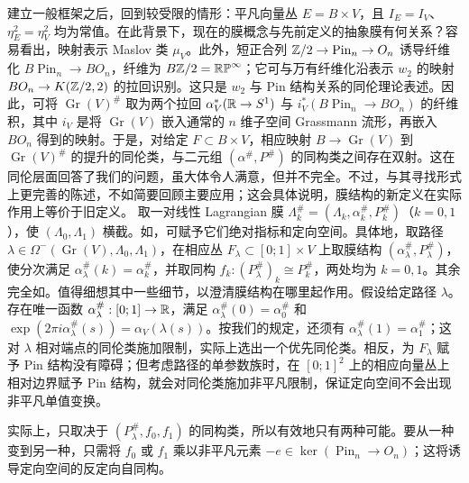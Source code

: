 建立一般框架之后，回到较受限的情形：平凡向量丛 $E=B\times V$，且 $I_E=I_V$、$\eta_E^2=\eta_V^2$ 均为常值。在此背景下，现在的膜概念与先前定义的抽象膜有何关系？容易看出，映射表示 Maslov 类 $\mu_V$。此外，短正合列 $\mathbb Z/2\to\operatorname{Pin}_n\to O_n$ 诱导纤维化 $B\operatorname{Pin}_n\to BO_n$，纤维为 $B\mathbb Z/2=\mathbb{RP}^\infty$；它可与万有纤维化沿表示 $w_2$ 的映射 $BO_n\to K(\mathbb Z/2,\allowbreak 2)$ 的拉回识别。这只是 $w_2$ 与 Pin 结构关系的同伦理论表述。因此，可将 $\operatorname{Gr}(V)^\#$ 取为两个拉回 $\alpha_V^*(\mathbb R\to S^1)$ 与 $i_V^*(B\operatorname{Pin}_n\to BO_n)$ 的纤维积，其中 $i_V$ 是将 $\operatorname{Gr}(V)$ 嵌入通常的 $n$ 维子空间 Grassmann 流形，再嵌入 $BO_n$ 得到的映射。于是，对给定 $F\subset B\times V$，相应映射 $B\to\operatorname{Gr}(V)$ 到 $\operatorname{Gr}(V)^\#$ 的提升的同伦类，与二元组 $(\alpha^\#,\allowbreak P^\#)$ 的同构类之间存在双射。这在同伦层面回答了我们的问题，虽大体令人满意，但并不完全。不过，与其寻找形式上更完善的陈述，不如简要回顾主要应用；这会具体说明，膜结构的新定义在实际作用上等价于旧定义。
取一对线性 Lagrangian 膜 $\Lambda_k^\#=(\Lambda_k,\allowbreak \alpha_k^\#,\allowbreak P_k^\#)$（$k=0,\allowbreak 1$），使 $(\Lambda_0,\allowbreak \Lambda_1)$ 横截。如，可赋予它们绝对指标和定向空间。具体地，取路径 $\lambda\in\Omega^-(\operatorname{Gr}(V),\allowbreak \Lambda_0,\allowbreak \Lambda_1)$，在相应丛 $F_\lambda\subset[0;1]\times V$ 上取膜结构 $(\alpha_\lambda^\#,\allowbreak P_\lambda^\#)$，使分次满足 $\alpha_\lambda^\#(k)=\alpha_k^\#$，并取同构 $f_k:(P_\lambda^\#)_k\cong P_k^\#$，两处均为 $k=0,\allowbreak 1$。其余完全如。值得细想其中一些细节，以澄清膜结构在哪里起作用。假设给定路径 $\lambda$。存在唯一函数 $\alpha_\lambda^\#:[0;1]\to\mathbb R$，满足 $\alpha_\lambda^\#(0)=\alpha_0^\#$ 和 $\exp(2\pi i\alpha_\lambda^\#(s))=\alpha_V(\lambda(s))$。按我们的规定，还须有 $\alpha_\lambda^\#(1)=\alpha_1^\#$；这对 $\lambda$ 相对端点的同伦类施加限制，实际上选出一个优先同伦类。相反，为 $F_\lambda$ 赋予 Pin 结构没有障碍；但考虑路径的单参数族时，在 $[0;1]^2$ 上的相应向量丛上相对边界赋予 Pin 结构，就会对同伦类施加非平凡限制，保证定向空间不会出现非平凡单值变换。
\begin{note}\label{st:11.19}
实际上，只取决于 $(P_\lambda^\#,\allowbreak f_0,\allowbreak f_1)$ 的同构类，所以有效地只有两种可能。要从一种变到另一种，只需将 $f_0$ 或 $f_1$ 乘以非平凡元素 $-e\in\ker(\operatorname{Pin}_n\to O_n)$；这将诱导定向空间的反定向自同构。
\end{note}
